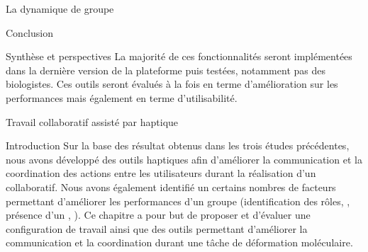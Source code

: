 \documentclass[myfrancais,ngerman,english,french]{mythesis}
\begin{document}
\begin{mychapter}{La dynamique de groupe}
\begin{mysection}{Conclusion}
\begin{mysubsection}{Synthèse et perspectives}
				La majorité de ces fonctionnalités seront implémentées dans la dernière version de la plateforme puis testées, notamment pas des biologistes.
				Ces outils seront évalués à la fois en terme d'amélioration sur les performances mais également en terme d'utilisabilité.
			\end{mysubsection}
		\end{mysection}
	\end{mychapter}
	\begin{mychapter}{Travail collaboratif assisté par haptique}
		\begin{mysection}{Introduction}
			Sur la base des résultat obtenus dans les trois études précédentes, nous avons développé des outils haptiques afin d'améliorer la communication et la coordination des actions entre les utilisateurs durant la réalisation d'un  collaboratif.
			Nous avons également identifié un certains nombres de facteurs permettant d'améliorer les performances d'un groupe (identification des rôles, \mybrainstorming, présence d'un , \myetc).
			Ce chapitre a pour but de proposer et d'évaluer une configuration de travail ainsi que des outils permettant d'améliorer la communication et la coordination durant une tâche de déformation moléculaire.


\end{mysection}
\end{mychapter}
\end{document}

